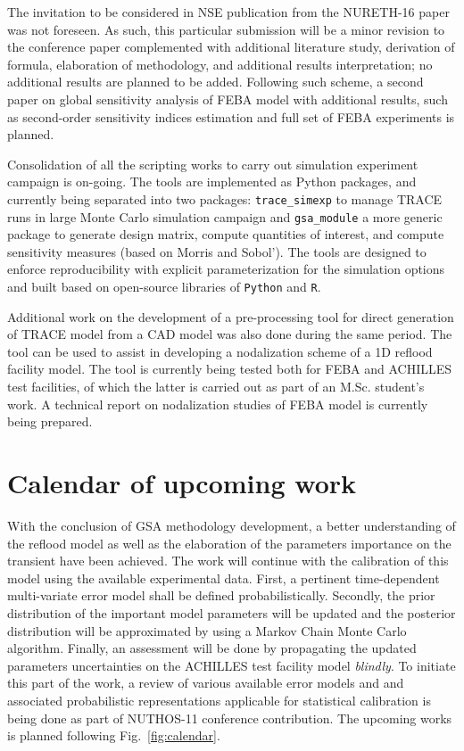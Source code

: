 \documentclass[11pt,titlepage]{article}
\begin{document}
The invitation to be considered in NSE publication from the NURETH-16 paper was not foreseen.
As such, this particular submission will be a minor revision to the conference paper complemented with
additional literature study, derivation of formula, elaboration of methodology, and additional
results interpretation; no additional results are planned to be added.
Following such scheme, a second paper on global sensitivity analysis of FEBA model with additional results, such as second-order sensitivity indices estimation and full set of FEBA experiments is planned.

Consolidation of all the scripting works to carry out simulation experiment campaign is 
on-going.
The tools are implemented as Python packages, and currently being separated 
into two packages: \texttt{trace\_simexp} to manage TRACE runs in large Monte Carlo 
simulation campaign and  \texttt{gsa\_module} a more generic package to generate design 
matrix, compute quantities of interest, and compute sensitivity measures 
(based on Morris and Sobol').
The tools are designed to enforce reproducibility with explicit parameterization for the simulation options and
built based on open-source libraries of \texttt{Python} and \texttt{R}.

Additional work on the development of a pre-processing tool 
for direct generation of TRACE model from a CAD model was also done during the same period.
The tool can be used to assist in developing a nodalization scheme of a 1D 
reflood facility model.
The tool is currently being tested both for FEBA and ACHILLES test facilities, of which 
the latter is carried out as part of an M.Sc. student's work.
A technical report on nodalization studies of FEBA model is currently being prepared.

\section{Calendar of upcoming work}

With the conclusion of GSA methodology development, a better understanding of the reflood model
as well as the elaboration of the parameters importance on the transient have been achieved.
The work will continue with the calibration of this model using the available experimental data.
First, a pertinent time-dependent multi-variate error model shall be defined probabilistically. 
Secondly, the prior distribution of the important model parameters will be updated and the posterior distribution will be approximated by using 
a Markov Chain Monte Carlo algorithm. 
Finally, an assessment will be done by propagating the updated parameters uncertainties on the
ACHILLES test facility model \emph{blindly}.
To initiate this part of the work, a review of various available error models and and associated probabilistic 
representations applicable for statistical calibration is being done as part of NUTHOS-11 conference
contribution. The upcoming works is planned following Fig.~\ref{fig:calendar}.
\end{document}
